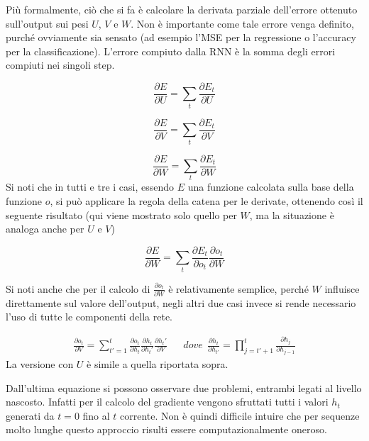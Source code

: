 Più formalmente, ciò che si fa è calcolare la derivata parziale dell'errore ottenuto sull'output sui pesi $U$, $V$ e $W$. Non è importante come tale errore venga definito, purché ovviamente sia sensato (ad esempio l'MSE per la regressione o l'accuracy per la classificazione). L'errore compiuto dalla RNN è la somma degli errori compiuti nei singoli step.

\begin{equation*}
    \frac{\partial E}{\partial U} = \sum_t{\frac{\partial E_t}{\partial U}}
\end{equation*}

\begin{equation*}
    \frac{\partial E}{\partial V} = \sum_t{\frac{\partial E_t}{\partial V}}
\end{equation*}

\begin{equation*}
    \frac{\partial E}{\partial W} = \sum_t{\frac{\partial E_t}{\partial W}}
\end{equation*}
Si noti che in tutti e tre i casi, essendo $E$ una funzione calcolata sulla base della funzione $o$, si può applicare la regola della catena per le derivate, ottenendo così il seguente risultato (qui viene mostrato solo quello per $W$, ma la situazione è analoga anche per $U$ e $V$)

\begin{equation*}
    \frac{\partial E}{\partial W} = \sum_t{\frac{\partial E_t}{\partial o_t}\frac{\partial o_t}{\partial W}}
\end{equation*}

Si noti anche che per il calcolo di $\frac{\partial o_t}{\partial W}$ è relativamente semplice, perché $W$ influisce direttamente sul valore dell'output, negli altri due casi invece si rende necessario l'uso di tutte le componenti della rete.

\begin{align*}
    \frac{\partial o_t}{\partial V} = \sum_{t'=1}^t{\frac{\partial o_t}{\partial h_t}\frac{\partial h_t}{\partial h_t'}\frac{\partial h_t'}{\partial V}}     &&     dove \ \ \frac{\partial h_t}{\partial h_{t'}} = \prod_{j=t'+1}^t {\frac{\partial h_j}{\partial h_{j-1}}}
\end{align*}
La versione con $U$ è simile a quella riportata sopra.

Dall'ultima equazione si possono osservare due problemi, entrambi legati al livello nascosto. Infatti per il calcolo del gradiente vengono sfruttati tutti i valori $h_t$ generati da $t=0$ fino al $t$ corrente. Non è quindi difficile intuire che per sequenze molto lunghe questo approccio risulti essere computazionalmente oneroso.

